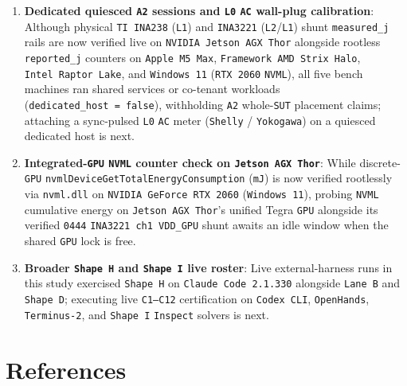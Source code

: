 \documentclass[10pt,letterpaper]{article}
\providecommand{\tightlist}{\setlength{\itemsep}{1pt}\setlength{\parskip}{0pt}}
\begin{document}
\begin{enumerate}
\def\labelenumi{\arabic{enumi}.}
\tightlist
\item
  \textbf{Dedicated quiesced \texttt{A2} sessions and \texttt{L0}
  \texttt{AC} wall-plug calibration}: Although physical
  \texttt{TI\ INA238} (\texttt{L1}) and \texttt{INA3221}
  (\texttt{L2}/\allowbreak{}\texttt{L1}) shunt \texttt{measured\_\allowbreak{}j} rails are now
  verified live on \texttt{NVIDIA\ Jetson\ AGX\ Thor} alongside rootless
  \texttt{reported\_\allowbreak{}j} counters on \texttt{Apple\ M5\ Max},
  \texttt{Framework\ AMD\ Strix\ Halo}, \texttt{Intel\ Raptor\ Lake},
  and \texttt{Windows\ 11} (\texttt{RTX\ 2060} \texttt{NVML}), all five
  bench machines ran shared services or co-tenant workloads
  (\texttt{dedicated\_\allowbreak{}host\ =\ false}), withholding \texttt{A2}
  whole-\texttt{SUT} placement claims; attaching a sync-pulsed
  \texttt{L0} \texttt{AC} meter (\texttt{Shelly} / \texttt{Yokogawa}) on
  a quiesced dedicated host is next.
\item
  \textbf{Integrated-\texttt{GPU} \texttt{NVML} counter check on
  \texttt{Jetson\ AGX\ Thor}}: While discrete-\texttt{GPU}
  \texttt{nvmlDeviceGetTotalEnergyConsumption} (\texttt{mJ}) is now
  verified rootlessly via \texttt{nvml.dll} on
  \texttt{NVIDIA\ GeForce\ RTX\ 2060} (\texttt{Windows\ 11}), probing
  \texttt{NVML} cumulative energy on \texttt{Jetson\ AGX\ Thor}'s
  unified Tegra \texttt{GPU} alongside its verified \texttt{0444}
  \texttt{INA3221\ ch1\ VDD\_\allowbreak{}GPU} shunt awaits an idle window when the
  shared \texttt{GPU} lock is free.
\item
  \textbf{Broader \texttt{Shape\ H} and \texttt{Shape\ I} live roster}:
  Live external-harness runs in this study exercised \texttt{Shape\ H}
  on \texttt{Claude\ Code\ 2.\allowbreak{}1.\allowbreak{}330} alongside \texttt{Lane\ B} and
  \texttt{Shape\ D}; executing live \texttt{C1–C12} certification on
  \texttt{Codex\ CLI}, \texttt{OpenHands}, \texttt{Terminus-\allowbreak{}2}, and
  \texttt{Shape\ I} \texttt{Inspect} solvers is next.
\end{enumerate}

\section{References}\label{references}
\end{document}
